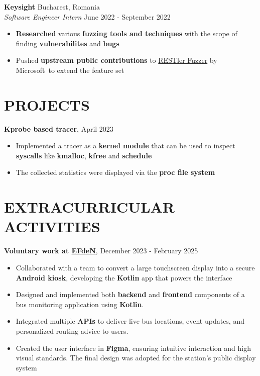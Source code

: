 \documentclass[a4paper,9pt]{extarticle}
\begin{document}
\noindent
\textbf{Keysight} \hfill Bucharest, Romania\\ %
\textit{Software Engineer Intern} \hfill June 2022 - September 2022 %
\begin{itemize}
    \item \textbf{Researched} various \textbf{fuzzing tools and techniques} with the scope of finding \textbf{vulnerabilites} and \textbf{bugs} %
    \item Pushed \textbf{upstream public contributions} to \href{https://github.com/microsoft/restler-fuzzer}{RESTler Fuzzer} by Microsoft to extend the feature set
\end{itemize}



\section*{PROJECTS}

\noindent
\textbf{Kprobe based tracer}, \hfill April 2023
\begin{itemize}
    \item Implemented a tracer as a \textbf{kernel module} that can be used to inspect \textbf{syscalls} like \textbf{kmalloc}, \textbf{kfree} and \textbf{schedule} %
    \item The collected statistics were displayed via the \textbf{proc file system}
\end{itemize}

\section*{EXTRACURRICULAR ACTIVITIES}
\noindent
\textbf{Voluntary work at \href{https://efden.org/}{EFdeN}}, \hfill December 2023 - February 2025
\begin{itemize}
    \item Collaborated with a team to convert a large touchscreen display into a secure \textbf{Android kiosk}, developing the \textbf{Kotlin} app that powers the interface
    \item Designed and implemented both \textbf{backend} and \textbf{frontend} components of a bus monitoring application using \textbf{Kotlin}. 
    \item Integrated multiple \textbf{APIs} to deliver live bus locations, event updates, and personalized routing advice to users.
    \item Created the user interface in \textbf{Figma}, ensuring intuitive interaction and high visual standards. The final design was adopted for the station’s public display system
\end{itemize}
\end{document}
